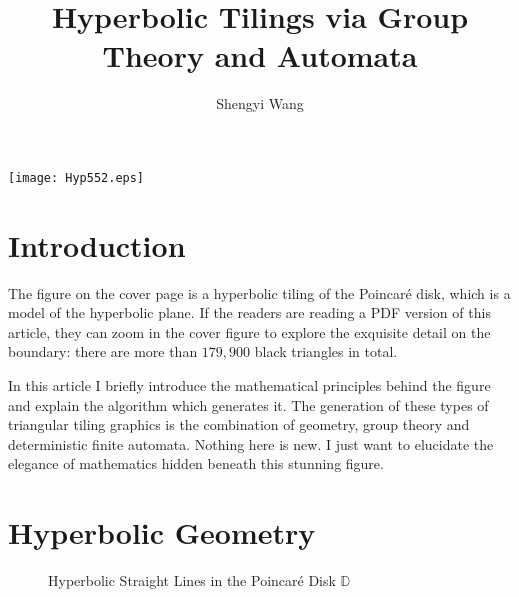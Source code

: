 \documentclass[12pt]{article}
\title{Hyperbolic Tilings via Group Theory and Automata}
\author{Shengyi Wang}
\begin{document}
\maketitle

\begin{center}
  \texttt{[image: Hyp552.eps]}
\end{center}

\section{Introduction}

The figure on the cover page is a hyperbolic tiling of the Poincar\'e
disk, which is a model of the hyperbolic plane. If the readers are
reading a PDF version of this article, they can zoom in the cover
figure to explore the exquisite detail on the boundary: there are more
than $179,900$ black triangles in total.

In this article I briefly introduce the mathematical principles behind
the figure and explain the algorithm which generates it. The
generation of these types of triangular tiling graphics is the
combination of geometry, group theory and deterministic finite
automata. Nothing here is new. I just want to elucidate the elegance
of mathematics hidden beneath this stunning figure.
 
\section{Hyperbolic Geometry}
\begin{figure}[htbp]
  \centering
  \caption{Hyperbolic Straight Lines in the Poincar\'e Disk $\mathbb{D}$}
  \label{fig:hyplines}
\end{figure}
\end{document}
